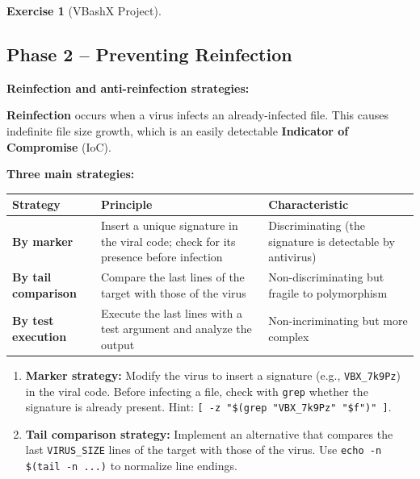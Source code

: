 \documentclass[a4paper,11pt]{article}
\theoremstyle{plain}
\theoremstyle{definition}
\newtheorem{exercice}{Exercise}
\begin{document}
\begin{exercice}[VBashX Project]
\begin{correction}
\end{correction}



\subsection*{Phase 2 -- Preventing Reinfection}

\begin{rappel}
\textbf{Reinfection and anti-reinfection strategies:}

\textbf{Reinfection} occurs when a virus infects an already-infected file. This causes indefinite file size growth, which is an easily detectable \textbf{Indicator of Compromise} (IoC).

\medskip
\textbf{Three main strategies:}

\begin{center}
\begin{tabular}{lp{5cm}p{4cm}}
\toprule
\textbf{Strategy} & \textbf{Principle} & \textbf{Characteristic} \\
\midrule
\textbf{By marker} & Insert a unique signature in the viral code; check for its presence before infection & Discriminating (the signature is detectable by antivirus) \\
\textbf{By tail comparison} & Compare the last lines of the target with those of the virus & Non-discriminating but fragile to polymorphism \\
\textbf{By test execution} & Execute the last lines with a test argument and analyze the output & Non-incriminating but more complex \\
\bottomrule
\end{tabular}
\end{center}
\end{rappel}

\begin{enumerate}
\item[\textbf{2a)}] \textbf{Marker strategy:} Modify the virus to insert a signature (e.g., \texttt{VBX\_7k9Pz}) in the viral code. Before infecting a file, check with \texttt{grep} whether the signature is already present. Hint: \texttt{[ -z "\$(grep "VBX\_7k9Pz" "\$f")" ]}.

\item[\textbf{2b)}] \textbf{Tail comparison strategy:} Implement an alternative that compares the last \texttt{VIRUS\_SIZE} lines of the target with those of the virus. Use \texttt{echo -n \$(tail -n ...)} to normalize line endings.


\end{enumerate}
\end{exercice}
\end{document}
